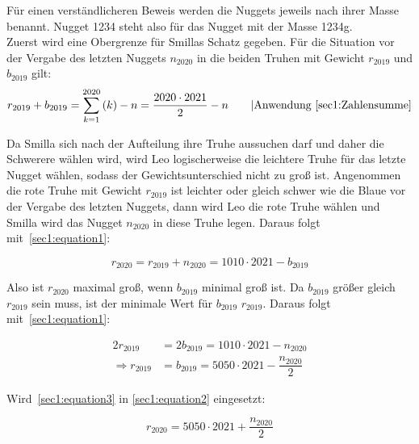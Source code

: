 \documentclass[10pt, a4paper]{amsart}
\makeatletter
\renewenvironment{proof}[1][\proofname]{\par
\pushQED{\qed}%
\normalfont \topsep6\p@\@plus6\p@\relax
\trivlist
\item\relax
{\bfseries#1}\hspace\labelsep\ignorespaces
}{%
\popQED\endtrivlist\@endpefalse
}
\newenvironment{proof thm}[1]{
\begin{proof}[\proofname~(#1)]}{\end{proof}}
\makeatother
\begin{document}
\begin{proof}
  Für einen verständlicheren Beweis werden die Nuggets jeweils nach ihrer Masse
  benannt. Nugget 1234 steht also für das Nugget mit der Masse 1234g.\\

  Zuerst wird eine Obergrenze für Smillas Schatz gegeben. Für die Situation vor
  der Vergabe des letzten Nuggets $n_{2020}$ in die beiden Truhen mit Gewicht
  $r_{2019}$ und $b_{2019}$ gilt:
  \begin{equation}\label{sec1:equation1}
    r_{2019}+b_{2019}=\sum_{k=1}^{2020}\left(k\right)-n=\dfrac{2020\cdot2021}{2}-n\qquad|\text{Anwendung
      \autoref{sec1:Zahlensumme}}
  \end{equation}

  Da Smilla sich nach der Aufteilung ihre Truhe aussuchen darf und daher die
  Schwerere wählen wird, wird Leo logischerweise die leichtere Truhe für das
  letzte Nugget wählen, sodass der Gewichtsunterschied nicht zu groß ist.
  Angenommen die rote Truhe mit Gewicht $r_{2019}$ ist leichter oder gleich
  schwer wie die Blaue vor der Vergabe des letzten Nuggets, dann wird Leo die
  rote Truhe wählen und Smilla wird das Nugget $n_{2020}$ in diese Truhe legen.
  Daraus folgt mit~\eqref{sec1:equation1}:

  \begin{equation}\label{sec1:equation2}
    r_{2020}=r_{2019}+n_{2020}=1010\cdot2021-b_{2019}
  \end{equation}

  Also ist $r_{2020}$ maximal groß, wenn $b_{2019}$ minimal groß ist. Da
  $b_{2019}$ größer gleich $r_{2019}$ sein muss, ist der minimale Wert für
  $b_{2019}$ $r_{2019}$. Daraus folgt mit~\eqref{sec1:equation1}:

  \begin{equation}\label{sec1:equation3}
    \begin{split}
      2r_{2019} &= 2b_{2019} =1010\cdot2021-n_{2020}\\
      \Rightarrow r_{2019} &= b_{2019}=5050\cdot2021-\dfrac{n_{2020}}{2}
    \end{split}
  \end{equation}

  Wird~\eqref{sec1:equation3} in \eqref{sec1:equation2} eingesetzt:

  \begin{equation*}
    r_{2020}=5050\cdot2021+\dfrac{n_{2020}}{2}
  \end{equation*}


\end{proof}
\end{document}
